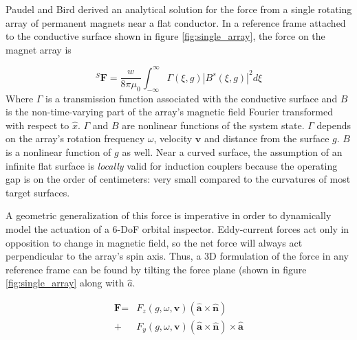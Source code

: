 \documentclass[letterpaper, 10 pt, conference]{ieeeconf}  %
\begin{document}
Paudel and Bird derived an analytical solution for the force from a single rotating array of permanent magnets near a flat conductor. \cite{Paudel2013} In a reference frame attached to the conductive surface shown in figure \ref{fig:single_array}, the force on the magnet array is

\begin{equation}
\label{eq:Paudel55}
{}^S\textbf{F} = \frac{w}{8\pi\mu_0} \int^{\infty}_{-\infty}\Gamma(\xi,g)|B^s(\xi,g)|^2 d\xi
\end{equation}
Where $\Gamma$ is a transmission function associated with the conductive surface and $B$ is the non-time-varying part of the array's magnetic field Fourier transformed with respect to $\hat{x}$.
% 
 $\Gamma$ and $B$ are nonlinear functions of the system state. $\Gamma$ depends on the array's rotation frequency $\omega$, velocity $\textbf{v}$ and distance from the surface $g$. $B$ is a nonlinear function of $g$ as well. Near a curved surface, the assumption of an infinite flat surface is \textit{locally} valid for induction couplers because the operating gap is on the order of centimeters: very small compared to the curvatures of most target surfaces. 
 
\par A geometric generalization of this force is imperative in order to dynamically model the actuation of a 6-DoF orbital inspector. Eddy-current forces act only in opposition to change in magnetic field, so the net force will always act perpendicular to the array's spin axis. Thus, a 3D formulation of the force in any reference frame can be found by tilting the force plane (shown in figure \ref{fig:single_array} along with $\hat{a}$. 


\begin{equation}
\label{eq:arrayForce}
\begin{split}
\textbf{F} =  &F_z(g,\omega,\textbf{v}) \left(\hat{\textbf{a}} \times \hat{\textbf{n}} \right) \\
			 + &F_y(g,\omega,\textbf{v}) \left(\hat{\textbf{a}} \times \hat{\textbf{n}} \right) \times \hat{\textbf{a}}
 \end{split}
 \end{equation}
 
\end{document}
